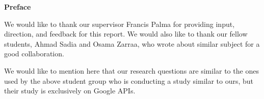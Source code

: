 \noindent \textbf{\large{Preface}}

 We would like to thank our supervisor Francis Palma for providing input, direction, and feedback for this report. We would also like to thank our fellow students, Ahmad Sadia and Osama Zarraa, who wrote about similar subject for a good collaboration. 
 
 We would like to mention here that our research questions are similar to the ones used by the above student group who is conducting a study similar to ours, but their study is exclusively on Google APIs.
\clearpage